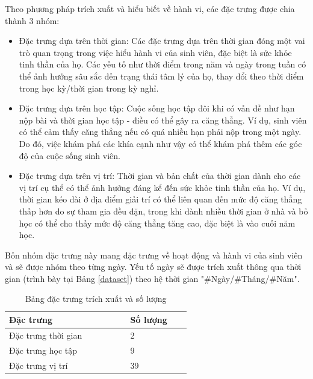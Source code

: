 Theo phương pháp trích xuất và hiểu biết về hành vi, các đặc trưng được chia thành 3 nhóm:
\begin{itemize}
    \item Đặc trưng dựa trên thời gian: Các đặc trưng dựa trên thời gian đóng một vai trò quan trọng trong việc hiểu hành vi của sinh viên, đặc biệt là sức khỏe tinh thần của họ. Các yếu tố như thời điểm trong năm và ngày trong tuần có thể ảnh hưởng sâu sắc đến trạng thái tâm lý của họ, thay đổi theo thời điểm trong học kỳ/thời gian trong kỳ nghỉ.
    \item Đặc trưng dựa trên học tập: Cuộc sống học tập đôi khi có vấn đề như hạn nộp bài và thời gian học tập - điều có thể gây ra căng thẳng. Ví dụ, sinh viên có thể cảm thấy căng thẳng nếu có quá nhiều hạn phải nộp trong một ngày. Do đó, việc khám phá các khía cạnh như vậy có thể khám phá thêm các góc độ của cuộc sống sinh viên.
    \item Đặc trưng dựa trên vị trí: Thời gian và bản chất của thời gian dành cho các vị trí cụ thể có thể ảnh hưởng đáng kể đến sức khỏe tinh thần của họ. Ví dụ, thời gian kéo dài ở địa điểm giải trí có thể liên quan đến mức độ căng thẳng thấp hơn do sự tham gia đều đặn, trong khi dành nhiều thời gian ở nhà và bỏ học có thể cho thấy mức độ căng thẳng tăng cao, đặc biệt là vào cuối năm học.


\end{itemize}
Bốn nhóm đặc trưng này mang đặc trưng về hoạt động và hành vi của sinh viên và sẽ được nhóm theo từng ngày. Yếu tố ngày sẽ được trích xuất thông qua thời gian (trình bày tại Bảng \ref{dataset}) theo hệ thời gian "\#Ngày/\#Tháng/\#Năm".
\begin{table}[ht]
\caption{Bảng đặc trưng trích xuất và số lượng }
\fontsize{13}{16}
\selectfont
\begin{center}
\begin{tabular}{p{0.4\linewidth}  p{0.2\linewidth}}
\hline
\textbf{Đặc trưng}&\textbf{Số lượng}\\
\hline
Đặc trưng thời gian& 2\\

Đặc trưng học tập& 9\\

Đặc trưng vị trí& 39\\

\hline
\end{tabular}
\label{tab1}
\end{center}
\end{table}

